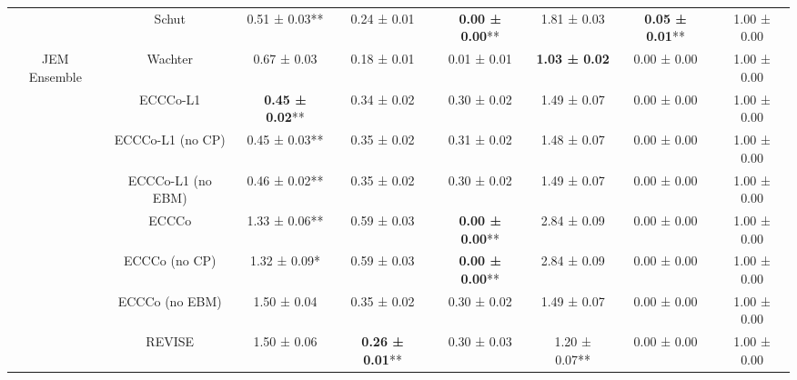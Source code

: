 \begin{table}
{\begin{tabular}[t]{cccccccc}
 & Schut & 0.51 ± 0.03** & 0.24 ± 0.01\hphantom{*}\hphantom{*} & \textbf{0.00 ± 0.00}** & 1.81 ± 0.03\hphantom{*}\hphantom{*} & \textbf{0.05 ± 0.01}** & 1.00 ± 0.00\hphantom{*}\hphantom{*}\\

\multirow[t]{-9}{*}{\centering\arraybackslash JEM Ensemble} & Wachter & 0.67 ± 0.03\hphantom{*}\hphantom{*} & 0.18 ± 0.01\hphantom{*}\hphantom{*} & 0.01 ± 0.01\hphantom{*}\hphantom{*} & \textbf{1.03 ± 0.02}\hphantom{*}\hphantom{*} & 0.00 ± 0.00\hphantom{*}\hphantom{*} & 1.00 ± 0.00\hphantom{*}\hphantom{*}\\
\cmidrule{1-8}
 & ECCCo-L1 & \textbf{0.45 ± 0.02}** & 0.34 ± 0.02\hphantom{*}\hphantom{*} & 0.30 ± 0.02\hphantom{*}\hphantom{*} & 1.49 ± 0.07\hphantom{*}\hphantom{*} & 0.00 ± 0.00\hphantom{*}\hphantom{*} & 1.00 ± 0.00\hphantom{*}\hphantom{*}\\

 & ECCCo-L1 (no CP) & 0.45 ± 0.03** & 0.35 ± 0.02\hphantom{*}\hphantom{*} & 0.31 ± 0.02\hphantom{*}\hphantom{*} & 1.48 ± 0.07\hphantom{*}\hphantom{*} & 0.00 ± 0.00\hphantom{*}\hphantom{*} & 1.00 ± 0.00\hphantom{*}\hphantom{*}\\

 & ECCCo-L1 (no EBM) & 0.46 ± 0.02** & 0.35 ± 0.02\hphantom{*}\hphantom{*} & 0.30 ± 0.02\hphantom{*}\hphantom{*} & 1.49 ± 0.07\hphantom{*}\hphantom{*} & 0.00 ± 0.00\hphantom{*}\hphantom{*} & 1.00 ± 0.00\hphantom{*}\hphantom{*}\\

 & ECCCo & 1.33 ± 0.06** & 0.59 ± 0.03\hphantom{*}\hphantom{*} & \textbf{0.00 ± 0.00}** & 2.84 ± 0.09\hphantom{*}\hphantom{*} & 0.00 ± 0.00\hphantom{*}\hphantom{*} & 1.00 ± 0.00\hphantom{*}\hphantom{*}\\

 & ECCCo (no CP) & 1.32 ± 0.09*\hphantom{*} & 0.59 ± 0.03\hphantom{*}\hphantom{*} & \textbf{0.00 ± 0.00}** & 2.84 ± 0.09\hphantom{*}\hphantom{*} & 0.00 ± 0.00\hphantom{*}\hphantom{*} & 1.00 ± 0.00\hphantom{*}\hphantom{*}\\

 & ECCCo (no EBM) & 1.50 ± 0.04\hphantom{*}\hphantom{*} & 0.35 ± 0.02\hphantom{*}\hphantom{*} & 0.30 ± 0.02\hphantom{*}\hphantom{*} & 1.49 ± 0.07\hphantom{*}\hphantom{*} & 0.00 ± 0.00\hphantom{*}\hphantom{*} & 1.00 ± 0.00\hphantom{*}\hphantom{*}\\

 & REVISE & 1.50 ± 0.06\hphantom{*}\hphantom{*} & \textbf{0.26 ± 0.01}** & 0.30 ± 0.03\hphantom{*}\hphantom{*} & 1.20 ± 0.07** & 0.00 ± 0.00\hphantom{*}\hphantom{*} & 1.00 ± 0.00\hphantom{*}\hphantom{*}\\


\end{tabular}}
\end{table}
